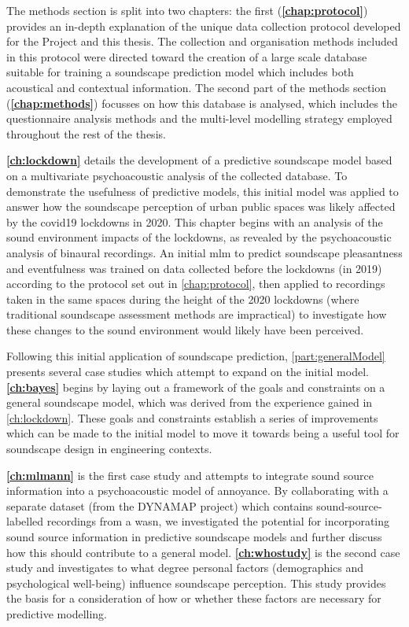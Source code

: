 The methods section is split into two chapters: the first (\textbf{\cref{chap:protocol}}) provides an in-depth explanation of the unique data collection protocol developed for the  Project and this thesis. The collection and organisation methods included in this protocol were directed toward the creation of a large scale database suitable for training a soundscape prediction model which includes both acoustical and contextual information. The second part of the methods section (\textbf{\cref{chap:methods}}) focusses on how this database is analysed, which includes the questionnaire analysis methods and the multi-level modelling strategy employed throughout the rest of the thesis.

\textbf{\cref{ch:lockdown}} details the development of a predictive soundscape model based on a multivariate psychoacoustic analysis of the collected database. To demonstrate the usefulness of predictive models, this initial model was applied to answer how the soundscape perception of urban public spaces was likely affected by the \gls{covid19} lockdowns in 2020. This chapter begins with an analysis of the sound environment impacts of the lockdowns, as revealed by the psychoacoustic analysis of binaural recordings. An initial \gls{mlm} to predict soundscape pleasantness and eventfulness was trained on data collected before the lockdowns (in 2019) according to the protocol set out in \cref{chap:protocol}, then applied to recordings taken in the same spaces during the height of the 2020 lockdowns (where traditional soundscape assessment methods are impractical) to investigate how these changes to the sound environment would likely have been perceived. 

Following this initial application of soundscape prediction, \cref{part:generalModel} presents several case studies which attempt to expand on the initial model. \textbf{\cref{ch:bayes}} begins by laying out a framework of the goals and constraints on a general soundscape model, which was derived from the experience gained in \cref{ch:lockdown}. These goals and constraints establish a series of improvements which can be made to the initial model to move it towards being a useful tool for soundscape design in engineering contexts. 

\textbf{\cref{ch:mlmann}} is the first case study and attempts to integrate sound source information into a psychoacoustic model of annoyance. By collaborating with a separate dataset (from the DYNAMAP project) which contains sound-source-labelled recordings from a \gls{wasn}, we investigated the potential for incorporating sound source information in predictive soundscape models and further discuss how this should contribute to a general model. \textbf{\cref{ch:whostudy}} is the second case study and investigates to what degree personal factors (demographics and psychological well-being) influence soundscape perception. This study provides the basis for a consideration of how or whether these factors are necessary for predictive modelling.

